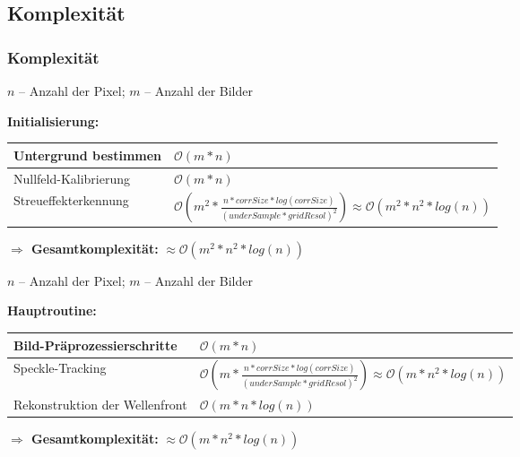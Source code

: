 \subsection{Komplexität}
\begin{frame}[allowframebreaks]
\frametitle{Komplexität}
\begin{center}
	$ n $ -- Anzahl der Pixel; $ m $ -- Anzahl der Bilder \\
\end{center}
\textbf{Initialisierung:} \\
\setlength\extrarowheight{5pt}
\begin{center}
	\begin{tabular}{| >{\centering\arraybackslash}m{4cm} | >{\centering\arraybackslash}m{5cm} |}
		\hline
		Untergrund bestimmen & $ \mathcal{O}(m * n) $ \\ \hline
		Nullfeld-Kalibrierung & $ \mathcal{O}(m * n) $ \\ \hline
		Streueffekterkennung & $ \mathcal{O}(m^2 * \frac{n * corrSize * log(corrSize)}{(underSample * gridResol)^2}) \approx \mathcal{O}(m^2 * n^2 * log(n)) $ \\ \hline
	\end{tabular}
\end{center}
\vspace{.5cm}
\textbf{$ \Rightarrow $ Gesamtkomplexität:} $ \approx \mathcal{O}(m^2 * n^2 * log(n)) $

\framebreak

\begin{center}
	$ n $ -- Anzahl der Pixel; $ m $ -- Anzahl der Bilder \\
\end{center}
\textbf{Hauptroutine:} \\
\setlength\extrarowheight{5pt}
\begin{center}
	\begin{tabular}{| >{\centering\arraybackslash}m{4cm} | >{\centering\arraybackslash}m{5cm} |}
		\hline
		Bild-Präprozessierschritte & $ \mathcal{O}(m * n) $ \\ \hline
		Speckle-Tracking & $ \mathcal{O}(m * \frac{n * corrSize * log(corrSize)}{(underSample * gridResol)^2}) \approx \mathcal{O}(m * n^2 * log(n))$ \\ \hline
		Rekonstruktion der Wellenfront & $ \mathcal{O}(m * n * log(n)) $ \\ \hline
	\end{tabular}
\end{center}
\vspace{.5cm}
\textbf{$ \Rightarrow $ Gesamtkomplexität:} $ \approx \mathcal{O}(m * n^2 * log(n)) $
\end{frame}

\fi
